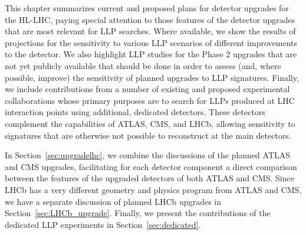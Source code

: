 This chapter summarizes current and proposed plans for detector upgrades for the HL-LHC, paying special attention to those features of the detector upgrades that are most relevant for LLP searches. Where available, we show the results of projections for the sensitivity to various LLP scenarios of different improvements to the detector. We also highlight LLP studies for the Phase 2 upgrades that are not yet publicly available that should be done in order to assess (and, where possible, improve) the sensitivity of planned upgrades to LLP signatures. Finally, we include contributions from a number of existing and proposed experimental collaborations whose primary purposes are to search for LLPs produced at LHC interaction points using additional, dedicated detectors. These detectors complement the capabilities of ATLAS, CMS, and LHCb, allowing sensitivity to signatures that are otherwise not possible to reconstruct at the main detectors.

In Section~\ref{sec:upgradelhc}, we combine the discussions of the planned ATLAS and CMS upgrades, facilitating for each detector component a direct comparison between the features of the upgraded detectors of both ATLAS and CMS. Since LHCb has a very different geometry and physics program from ATLAS and CMS, we have a separate discussion of planned LHCb upgrades in Section~\ref{sec:LHCb_upgrade}. Finally, we present the contributions of the dedicated LLP experiments in Section~\ref{sec:dedicated}.




